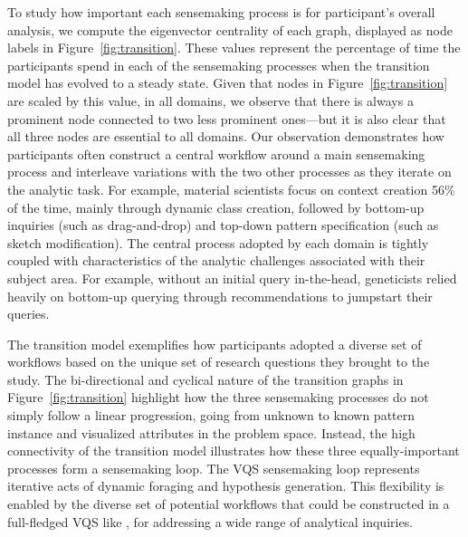 \par To study how important each sensemaking process 
is for participant's overall analysis, 
we compute the eigenvector centrality of each graph, 
displayed as node labels in Figure~\ref{fig:transition}. 
These values represent the percentage of time the participants
spend in each of the sensemaking processes 
when the transition model has evolved to a steady state. 
Given that nodes in Figure~\ref{fig:transition} 
are scaled by this value, in all domains, 
we observe that there is always a prominent node 
connected to two less prominent ones---but it is also clear
that all three nodes are essential to all domains.
Our observation demonstrates how participants 
often construct a central workflow 
around a main sensemaking process 
and interleave variations with the two other processes 
as they iterate on the analytic task. 
For example, material scientists focus 
on context creation 56\% of the time, 
mainly through dynamic class creation, 
followed by bottom-up inquiries (such as drag-and-drop)
 and top-down pattern specification (such as sketch modification). 
The central process adopted by each domain 
is tightly coupled with characteristics 
of the analytic challenges associated with their subject area. 
For example, without an initial query in-the-head, 
geneticists relied heavily on bottom-up querying 
through recommendations to jumpstart their queries. 
\par The transition model exemplifies how participants 
adopted a diverse set of workflows 
based on the unique set of research questions they brought to the study. 
The bi-directional and cyclical nature 
of the transition graphs in Figure~\ref{fig:transition} highlight how the three sensemaking processes do not simply follow a linear progression, going from unknown to known pattern instance and visualized attributes in the problem space. Instead, the high connectivity of the transition model illustrates how these three equally-important processes form a sensemaking loop. The VQS sensemaking loop represents iterative acts of dynamic foraging and hypothesis generation. This flexibility is enabled by the diverse set of potential workflows that could be constructed in a full-fledged VQS like \zvpp, for addressing a wide range of analytical inquiries.%

